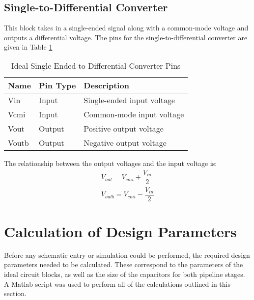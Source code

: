 \subsection{Single-to-Differential Converter}
This block takes in a single-ended signal along with a common-mode voltage and outputs a differential voltage. The pins for the single-to-differential converter are given in Table \ref{tab:s2dpins}
\begin{table}[htbp]
\begin{center}
\begin{tabular}{|l|l|l|}
\hline
Name & Pin Type & Description \\ \hline
Vin & Input & Single-ended input voltage \\ \hline
Vcmi & Input & Common-mode input voltage \\ \hline
Vout & Output & Positive output voltage \\ \hline
Voutb & Output & Negative output voltage \\ \hline
\end{tabular}
\end{center}
\caption{Ideal Single-Ended-to-Differential Converter Pins}
\label{tab:s2dpins}
\end{table}
The relationship between the output voltages and the input voltage is:
\begin{align}
\label{eq:s2d}
V_{out} = V_{cmi} + \dfrac{V_{in}}{2} \\[0.5em]
\nonumber V_{outb} = V_{cmi} - \dfrac{V_{in}}{2}
\end{align}
\section{Calculation of Design Parameters}
\label{sec:designparameters}
Before any schematic entry or simulation could be performed, the required design parameters needed to be calculated. These correspond to the parameters of the ideal circuit blocks, as well as the size of the capacitors for both pipeline stages. A Matlab script was used to perform all of the calculations outlined in this section.
